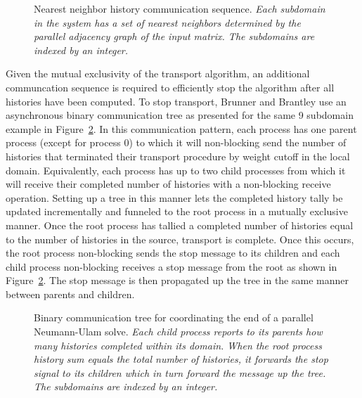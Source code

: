 \documentclass{snamc2013}
\begin{document}
\begin{figure}[h!]
  \begin{center}
    \scalebox{0.7}{  }
  \end{center}
  \caption{Nearest neighbor history communication sequence.
    \textit{Each subdomain in the system has a set of nearest
      neighbors determined by the parallel adjacency graph of the
      input matrix. The subdomains are indexed by an integer.}}
  \label{fig:nearest_neighbor_comm}
\end{figure}
Given the mutual exclusivity of the transport algorithm, an additional
communcation sequence is required to efficiently stop the algorithm
after all histories have been computed. To stop transport, Brunner and
Brantley use an asynchronous binary communication tree as presented
for the same 9 subdomain example in
Figure~\ref{fig:binary_comm_tree}. In this communication pattern, each
process has one parent process (except for process 0) to which it will
non-blocking send the number of histories that terminated their
transport procedure by weight cutoff in the local
domain. Equivalently, each process has up to two child processes from
which it will receive their completed number of histories with a
non-blocking receive operation. Setting up a tree in this manner lets
the completed history tally be updated incrementally and funneled to
the root process in a mutually exclusive manner. Once the root process
has tallied a completed number of histories equal to the number of
histories in the source, transport is complete. Once this occurs, the
root process non-blocking sends the stop message to its children and
each child process non-blocking receives a stop message from the root
as shown in Figure~\ref{fig:binary_comm_tree}. The stop message is
then propagated up the tree in the same manner between parents and
children.
\begin{figure}[h!]
  \begin{center}
    \scalebox{0.6}{
       }
  \end{center}
  \caption{Binary communication tree for coordinating the end of a
    parallel Neumann-Ulam solve. \textit{Each child process reports to
      its parents how many histories completed within its domain. When
      the root process history sum equals the total number of
      histories, it forwards the stop signal to its children which in
      turn forward the message up the tree. The subdomains are indexed
      by an integer.}}
  \label{fig:binary_comm_tree}
\end{figure}
\end{document}
